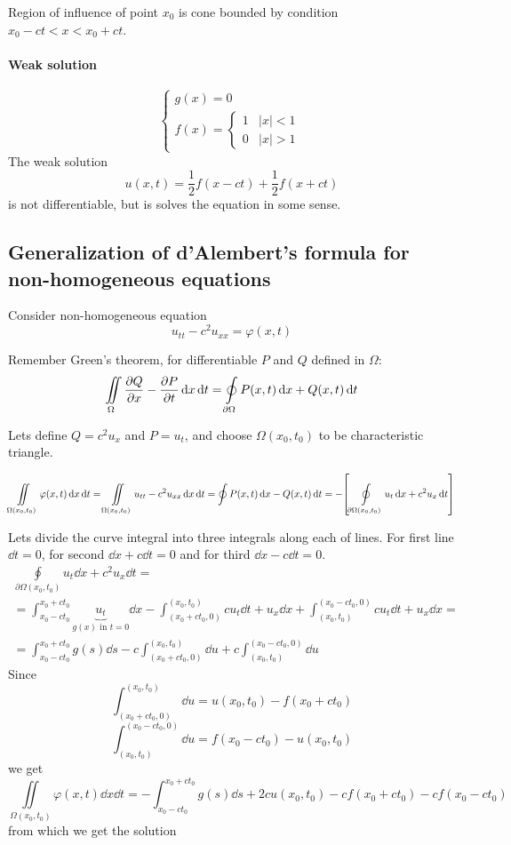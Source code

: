 Region of influence of point $x_0$ is cone bounded by condition $x_0-ct<x<x_0+ct$.
\begin{center}	
	
\end{center}
\paragraph{Weak solution}
$$\begin{cases}
g(x) = 0\\f(x) = \begin{cases}
1 & |x| <1 \\
0 & |x| > 1
\end{cases}
\end{cases}$$
The weak solution
$$u(x,t) = \frac{1}{2}f(x-ct)+\frac{1}{2}f(x+ct)$$
is not differentiable, but is solves the equation in some sense.
\subsection{Generalization of  d'Alembert's formula for non-homogeneous equations}
Consider non-homogeneous equation
$$u_{tt} - c^2 u_{xx} = \varphi(x,t)$$

Remember Green's theorem, for differentiable $P$ and $Q$ defined in $\Omega$:
$$\iint\limits_\Omega \pdv{Q}{x} - \pdv{P}{t} \dd{x} \dd{t} = \oint\limits_{\partial \Omega} P(x,t) \dd{x} + Q(x,t) \dd{t}$$

Lets define $Q=c^2u_x$ and $P=u_t$, and choose $\Omega(x_0, t_0)$ to be characteristic triangle.

$$\iint\limits_{\Omega(x_0, t_0)} \varphi(x,t) \dd{x} \dd{t} = \iint\limits_{\Omega(x_0, t_0)} u_{tt} - c^2 u_{xx} \dd{x} \dd{t} = \oint P(x,t) \dd{x} - Q(x,t) \dd{t} = - \qty[\oint\limits_{\partial \Omega(x_0, t_0)} u_t \dd{x} + c^2u_x \dd{t}] $$

Lets divide the curve integral into three integrals along each of lines. For first line $\dd{t} = 0$, for second $\dd{x} + c\dd{t} = 0$ and for third $\dd{x} - c\dd{t} = 0$.
\begin{align*}
\oint\limits_{\partial \Omega(x_0, t_0)} u_t \dd{x} + c^2u_x \dd{t} =\\= \int_{x_0-ct_0}^{x_0+ct_0} \underbrace{u_t}_{g(x) \text{ in } t=0} \dd{x} - \int_{(x_0+ct_0,0)}^{(x_0, t_0)} cu_t \dd{t} + u_x \dd{x} +  \int_{(x_0, t_0)}^{(x_0-ct_0,0)} cu_t \dd{t} + u_x \dd{x} =\\= \int_{x_0-ct_0}^{x_0+ct_0} g(s) \dd{s} - c\int_{(x_0+ct_0,0)}^{(x_0, t_0)} \dd{u} + c \int_{(x_0, t_0)}^{(x_0-ct_0,0)} \dd{u} 
\end{align*}
Since
$$\int_{(x_0+ct_0,0)}^{(x_0, t_0)} \dd{u} = u(x_0, t_0) - f(x_0+ct_0) $$
$$ \int_{(x_0, t_0)}^{(x_0-ct_0,0)} \dd{u} = f(x_0-ct_0) -  u(x_0, t_0) $$
we get
$$\iint\limits_{\Omega(x_0, t_0)} \varphi(x,t) \dd{x} \dd{t} = -\int_{x_0-ct_0}^{x_0+ct_0} g(s) \dd{s} + 2cu(x_0, t_0) - cf(x_0+ct_0) - cf(x_0-ct_0) $$
from which we get the solution

